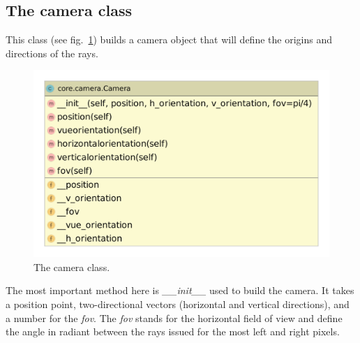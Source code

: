 \documentclass[acmsmall]{acmart}
\begin{document}
\subsection*{The camera class}
This class (see fig.~\ref{fig:camera}) builds a camera object that will define the origins and directions of the rays.
\begin{figure}[h]
    \centering
    \includegraphics[scale=0.3]{img/camera.pdf}
    \caption{The camera class.}
    \label{fig:camera}
\end{figure}
The most important method here is \emph{\_\_init\_\_} used to build the camera. It takes a position point, two-directional vectors (horizontal and vertical directions), and a number for the \textit{fov}.
The \textit{fov} stands for the horizontal field of view and define the angle in radiant between the rays issued for the most left and right pixels.
\end{document}
